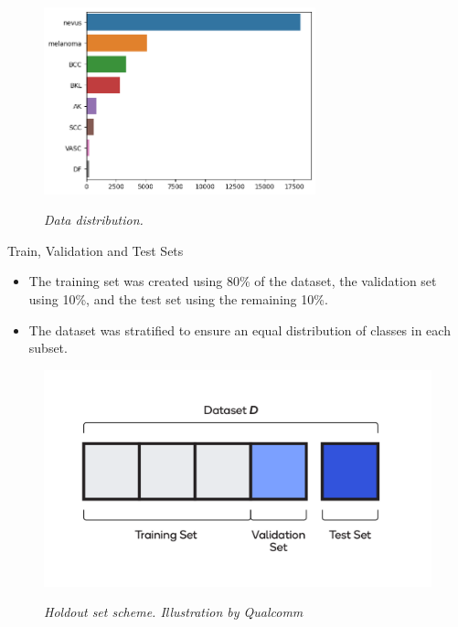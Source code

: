 \documentclass[dvipsnames,mathserif]{beamer}
\begin{document}
{\begin{frame}
      \begin{figure}[H]
        \centering
        \includegraphics[width=0.7\textwidth]{images/hole-dataset-diagnosis.png}
        \caption[Data distribution]{\textit{Data distribution. }}
        {\label{fig:hole-dataset-distribution}}
      \end{figure}

    \end{frame}

    \begin{frame}

      \large  Train, Validation and Test Sets
      \vspace{0.25cm}

      \footnotesize

      \begin{itemize}
        \item The training set was created using 80\% of the dataset, the validation set using 10\%, and the test set using the remaining 10\%.
        \item The dataset was stratified to ensure an equal distribution of classes in each subset.
      \end{itemize}


      \begin{figure}[H]
        \centering
        \begin{adjustbox}{width=0.6\textwidth, trim={0cm 0.5cm 0cm 0.5cm}, clip}
          \includegraphics[width=\textwidth]{images/train-test-validation-sets.png}
        \end{adjustbox}
        \caption[Holdout set scheme]{\textit{Holdout set scheme. Illustration by Qualcomm}}
        {\label{fig:holdout-test-scheme}}
      \end{figure}


\end{frame}}
\end{document}
